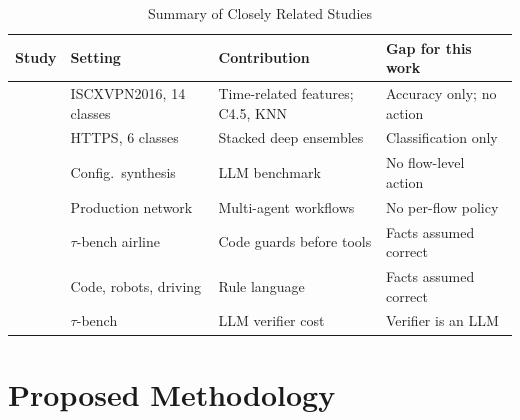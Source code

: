 \documentclass[conference]{IEEEtran}
\begin{document}
\begin{table}[t]
\centering
\caption{Summary of Closely Related Studies}
\label{tab:related}
\footnotesize
\setlength{\tabcolsep}{3pt}
\begin{tabular}{@{}L{1.0cm}L{2.3cm}L{2.25cm}L{2.15cm}@{}}
\toprule
Study & Setting & Contribution & Gap for this work \\
\midrule
\cite{drapergil2016} & ISCXVPN2016, 14 classes & Time-related features; C4.5, KNN & Accuracy only; no action \\
\cite{elshewey2025} & HTTPS, 6 classes & Stacked deep ensembles & Classification only \\
\cite{wang2024netconfeval} & Config.\ synthesis & LLM benchmark & No flow-level action \\
\cite{wang2025confucius} & Production network & Multi-agent workflows & No per-flow policy \\
\cite{zwerdling2025} & $\tau$-bench airline & Code guards before tools & Facts assumed correct \\
\cite{wang2026agentspec} & Code, robots, driving & Rule language & Facts assumed correct \\
\cite{sah2026verifier} & $\tau$-bench & LLM verifier cost & Verifier is an LLM \\
\bottomrule
\end{tabular}
\end{table}

\section{Proposed Methodology}
\end{document}
